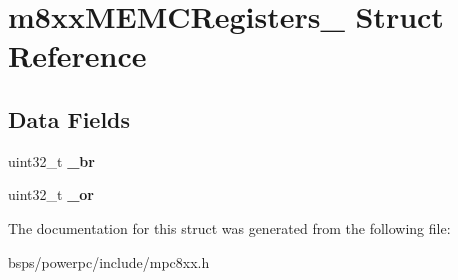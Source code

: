 \hypertarget{structm8xxMEMCRegisters__}{}\section{m8xx\+M\+E\+M\+C\+Registers\+\_\+ Struct Reference}
\label{structm8xxMEMCRegisters__}
\subsection*{Data Fields}
\begin{DoxyCompactItemize}
\item 
\mbox{\label{structm8xxMEMCRegisters___aec7f231000ec225007e3f456ebedd9a6}} 
uint32\+\_\+t {\bfseries \+\_\+br}
\item 
\mbox{\label{structm8xxMEMCRegisters___a67b0f04f01932219c5cfd3b421cd11c5}} 
uint32\+\_\+t {\bfseries \+\_\+or}
\end{DoxyCompactItemize}


The documentation for this struct was generated from the following file\+:\begin{DoxyCompactItemize}
\item 
bsps/powerpc/include/mpc8xx.\+h\end{DoxyCompactItemize}
